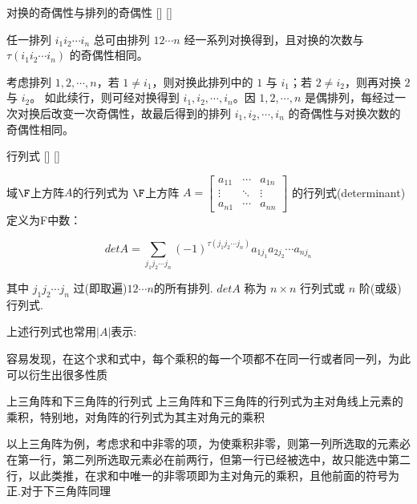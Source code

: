 \documentclass[UTF8]{ctexart}
\begin{document}
        \begin{ppt}
			[]
			{对换的奇偶性与排列的奇偶性}
			[]
			[]

            任一排列 $i_{1} i_{2} \cdots i_{n}$ 总可由排列 $12 \cdots n$ 经一系列对换得到，且对换的次数与 $\tau(i_{1} i_{2} \cdots i_{n})$ 的奇偶性相同。
        \end{ppt}
        \begin{prf}
            考虑排列 $1, 2, \cdots, n$，若 $1 \neq i_1$，则对换此排列中的 $1$ 与 $i_1$；若 $2 \neq i_2$，则再对换 $2$ 与 $i_2$。
            如此续行，则可经对换得到 $i_1, i_2, \cdots, i_n$。因 $1, 2, \cdots, n$ 是偶排列，每经过一次对换后改变一次奇偶性，故最后得到的排列 $i_1, i_2, \cdots, i_n$ 的奇偶性与对换次数的奇偶性相同。

        \end{prf}
	
		\begin{dfn}
			[]
			{行列式}
			[]
			[]
  
            域$\F$上方阵$A$的行列式为
			$\F$上方阵 $A = \begin{bmatrix} a_{11} & \cdots & a_{1n} \\ \vdots & \ddots & \vdots \\ a_{n1} & \cdots & a_{nn} \end{bmatrix}$ 的行列式(determinant)定义为F中数：

            \[det A = \sum_{j_1 j_2 \cdots j_n} (-1)^{\tau(j_1 j_2 \cdots j_n)} a_{1j_1} a_{2j_2} \cdots a_{nj_n}\]

            其中 $j_1 j_2 \cdots j_n$ 过(即取遍)$12 \cdots n$的所有排列. $detA$ 称为 $n \times n$ 行列式或 $n$ 阶(或级)行列式.

            上述行列式也常用$|A|$表示:

		\end{dfn}

        容易发现，在这个求和式中，每个乘积的每一个项都不在同一行或者同一列，为此可以衍生出很多性质

        \begin{ppt}
            {上三角阵和下三角阵的行列式}
            上三角阵和下三角阵的行列式为主对角线上元素的乘积，特别地，对角阵的行列式为其主对角元的乘积
        \end{ppt}

        \begin{prf}
            以上三角阵为例，考虑求和中非零的项，为使乘积非零，则第一列所选取的元素必在第一行，第二列所选取元素必在前两行，但第一行已经被选中，故只能选中第二行，以此类推，在求和中唯一的非零项即为主对角元的乘积，且他前面的符号为正.对于下三角阵同理
        \end{prf}
	
\end{document}
